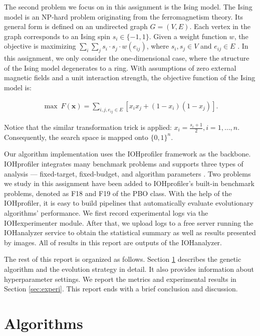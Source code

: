 \documentclass{article}
\begin{document}
The second problem we focus on in this assignment is the Ising model. The Ising model is an NP-hard problem originating from the ferromagnetism theory. Its general form is defined on an undirected graph $G = \left( V, E \right) $. Each vertex in the graph corresponds to an Ising spin $s_i\in \{-1, 1\}$. Given a weight function $w$, the objective is maximizing $\sum_i\sum_j s_i\cdot s_j \cdot w(e_{ij})$, where $s_i, s_j\in V$ and $e_{ij}\in E$ \cite{2004briest}. In this assignment, we only consider the one-dimensional case, where the structure of the Ising model degenerates to a ring. With assumptions of zero
external magnetic fields and a unit interaction strength, the objective function of the Ising model is:

\begin{align*}
    \max\ F\left( \mathbf{x} \right) = \sum_{i, j, e_{ij}\in E} \left[ x_ix_j + \left( 1 - x_i \right)\left( 1 - x_j \right) \right].
\end{align*}

Notice that the similar transformation trick is applied: $x_i = \frac{s_i + 1}{2}, i = 1, \dots, n$. Consequently, the search space is mapped onto $\{0, 1\}^n$.

Our algorithm implementation uses the IOHprofiler framework as the backbone. IOHprofiler integrates many benchmark problems and supports three types of analysis --- fixed-target, fixed-budget, and algorithm parameters \cite{2018doerr}. Two problems we study in this assignment have been added to IOHprofiler's built-in benchmark problems, denoted as F18 and F19 of the PBO class. With the help of the IOHprofiler, it is easy to build pipelines that automatically evaluate evolutionary algorithms' performance. We first record experimental logs via the IOHexperimenter module. After that, we upload logs to a free server running the IOHanalyzer service to obtain the statistical summary as well as results presented by images. All of results in this report are outputs of the IOHanalyzer.

The rest of this report is organized as follows. Section \ref{sec:imple} describes the genetic algorithm and the evolution strategy in detail. It also provides information about hyperparameter settings. We report the metrics and experimental results in Section \ref{sec:experi}. This report ends with a brief conclusion and discussion.


\section{Algorithms}
\label{sec:imple}
\end{document}
